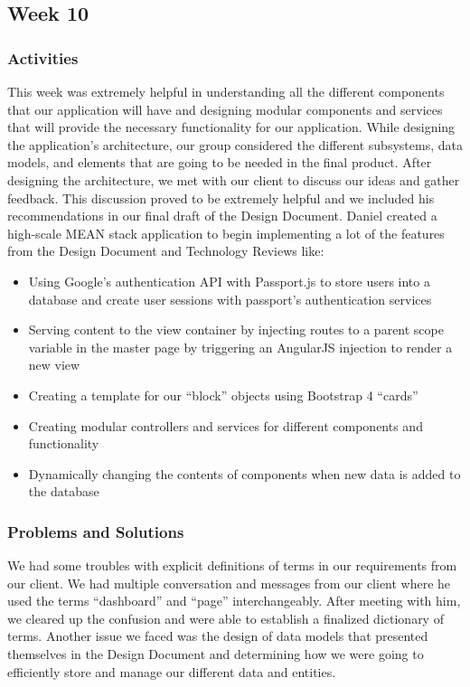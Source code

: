 \documentclass[journal,10pt,onecolumn,compsoc]{IEEEtran} \usepackage[margin=1.0in]{geometry} \usepackage{pdfpages}
\begin{document}
    \subsection{Week 10}
    \subsubsection{Activities} 
    This week was extremely helpful in understanding all the different components that our application will have and designing modular components and services that will provide the necessary functionality for our application. While designing the application's architecture, our group considered the different subsystems, data models, and elements that are going to be needed in the final product. After designing the architecture, we met with our client to discuss our ideas and gather feedback. This discussion proved to be extremely helpful and we included his recommendations in our final draft of the Design Document.
    \noindent Daniel created a high-scale MEAN stack application to begin implementing a lot of the features from the Design Document and Technology Reviews like:
    \begin{itemize}
        \item Using Google’s authentication API with Passport.js to store users into a database and create user sessions with passport’s authentication services
        \item Serving content to the view container by injecting routes to a parent scope variable in the master page by triggering an AngularJS injection to render a new view
        \item Creating a template for our “block” objects using Bootstrap 4 “cards”
        \item Creating modular controllers and services for different components and functionality
        \item Dynamically changing the contents of components when new data is added to the database
    \end{itemize}
    
    \subsubsection{Problems and Solutions} 
    We had some troubles with explicit definitions of terms in our requirements from our client. We had multiple conversation and messages from our client where he used the terms ``dashboard'' and ``page'' interchangeably. After meeting with him, we cleared up the confusion and were able to establish a finalized dictionary of terms. Another issue we faced was the design of data models that presented themselves in the Design Document and determining how we were going to efficiently store and manage our different data and entities. 
\end{document}
